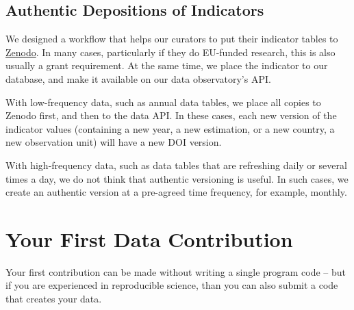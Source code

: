 \documentclass[
  a4paper,
  openany, a4paper, oneside]{book}
\begin{document}
\hypertarget{deposit-indicator}{%
\subsection{Authentic Depositions of Indicators}\label{deposit-indicator}}

We designed a workflow that helps our curators to put their indicator tables to \href{}{Zenodo}. In many cases, particularly if they do EU-funded research, this is also usually a grant requirement. At the same time, we place the indicator to our database, and make it available on our data observatory's API.

With low-frequency data, such as annual data tables, we place all copies to Zenodo first, and then to the data API. In these cases, each new version of the indicator values (containing a new year, a new estimation, or a new country, a new observation unit) will have a new DOI version.

With high-frequency data, such as data tables that are refreshing daily or several times a day, we do not think that authentic versioning is useful. In such cases, we create an authentic version at a pre-agreed time frequency, for example, monthly.

\hypertarget{your-first-data-contribution}{%
\section{Your First Data Contribution}\label{your-first-data-contribution}}

Your first contribution can be made without writing a single program code -- but if you are experienced in reproducible science, than you can also submit a code that creates your data.
\end{document}

